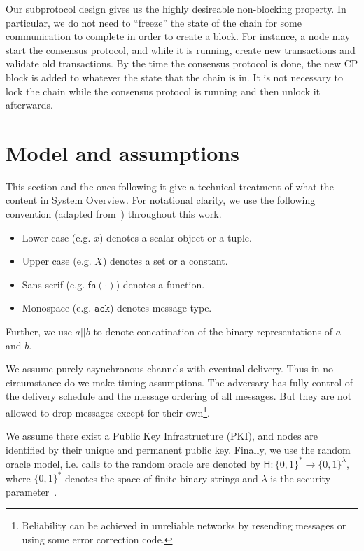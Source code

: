 Our subprotocol design gives us the highly desireable non-blocking property.
In particular, we do not need to ``freeze'' the state of the chain for some communication to complete in order to create a block.
For instance, a node may start the consensus protocol, and while it is running, create new transactions and validate old transactions.
By the time the consensus protocol is done, the new CP block is added to whatever the state that the chain is in.
It is not necessary to lock the chain while the consensus protocol is running and then unlock it afterwards.

\section{Model and assumptions}
\label{sec:model-assumptions}

This section and the ones following it give a technical treatment of what the content in System Overview.
For notational clarity, we use the following convention (adapted from~\cite{miller2016honey}) throughout this work.
\begin{itemize}
\item Lower case (e.g. $x$) denotes a scalar object or a tuple.
\item Upper case (e.g. $X$) denotes a set or a constant.
\item Sans serif (e.g. $\textsf{fn}(\cdot)$) denotes a function.
\item Monospace (e.g. $\texttt{ack}$) denotes message type.
\end{itemize}
Further, we use $a || b$ to denote concatination of the binary representations of $a$ and $b$.

We assume purely asynchronous channels with eventual delivery.
Thus in no circumstance do we make timing assumptions.
The adversary has fully control of the delivery schedule and the message ordering of all messages.
But they are not allowed to drop messages except for their own\footnote{
    Reliability can be achieved in unreliable networks by resending messages or using some error correction code.
}.

We assume there exist a Public Key Infrastructure (PKI), and nodes are identified by their unique and permanent public key.
Finally, we use the random oracle model, i.e. calls to the random oracle are denoted by $\textsf{H}: \{0, 1\}^* \rightarrow \{0, 1\}^\lambda$,
where $\{0, 1\}^*$ denotes the space of finite binary strings and $\lambda$ is the security parameter~\cite{bellare1993random}.

